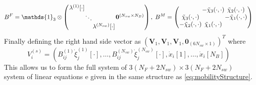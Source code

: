 \begin{equation*}
\arraycolsep=0.4pt\def\arraystretch{1}
    B^F = \mathds{1}_{3} \otimes \left(\begin{array}{cc}
         \begin{array}{ccc}
             \lambda^{(1)}[\cdot] & & \\
              & \ddots & \\
              & & \lambda^{(N_{sw})}[\cdot]
         \end{array} & \bm{0}^{(N_{sw} \times N_B)}
    \end{array}\right), \;
    B^M =
    \left(\begin{array}{ccc}
             & -\tilde{\chi}_3(\cdot,\cdot) & \tilde{\chi}_2(\cdot,\cdot)\\
            \tilde{\chi}_3(\cdot,\cdot) & & -\tilde{\chi}_1(\cdot,\cdot)\\
            -\tilde{\chi}_2(\cdot,\cdot) & \tilde{\chi}_1(\cdot,\cdot) &
          \end{array}\right)
\end{equation*}
Finally defining the right hand side vector as $(\bm{V}_1,\bm{V}_1,\bm{V}_1,\bm{0}_{(6N_{sw} \times 1)})^T$ where
\begin{equation*}
    V_i^{(s)} = (B_{ij}^{(1)}\dot{\xi}_j^{(1)}[\cdot],\dots,B_{ij}^{(N_{sw})}\dot{\xi}_j^{(N_{sw})}[\cdot],\dot{x}_i[1],\dots,\dot{x}_i[N_B])
\end{equation*}
This allows us to form the full system of $3(N_F+2N_{sw})\times3(N_F+2N_{sw})$ system of linear equations e given in the same structure as \cref{eq:mobilityStructure}.


